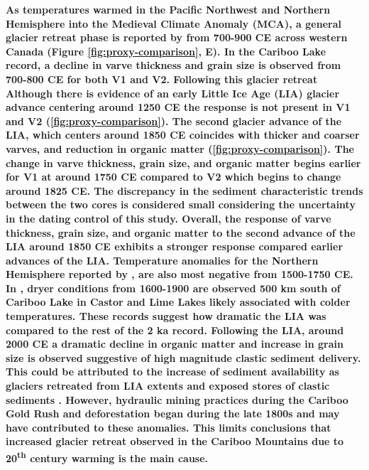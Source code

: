 \documentclass[Royal,times,doublespace,sageh]{sagej}
\begin{document}
\textbf{As temperatures warmed in the Pacific Northwest
\citep{Steinman2012} and Northern Hemisphere \citep{Moberg2005} into the
Medieval Climate Anomaly (MCA), a general glacier retreat phase is
reported by \citet{Solomina2016} from 700-900 CE across western Canada
(Figure \ref{fig:proxy-comparison}, E). In the Cariboo Lake record, a
decline in varve thickness and grain size is observed from 700-800 CE
for both V1 and V2. Following this glacier retreat Although there is
evidence of an early Little Ice Age (LIA) glacier advance centering
around 1250 CE \citep{Luckman1995, Osborn2001, Leonard1997} the response
is not present in V1 and V2 (\ref{fig:proxy-comparison}). The second
glacier advance of the LIA, which centers around 1850 CE
\citep{Luckman2000e, Leonard1997} coincides with thicker and coarser
varves, and reduction in organic matter (\ref{fig:proxy-comparison}).
The change in varve thickness, grain size, and organic matter begins
earlier for V1 at around 1750 CE compared to V2 which begins to change
around 1825 CE. The discrepancy in the sediment characteristic trends
between the two cores is considered small considering the uncertainty in
the dating control of this study. Overall, the response of varve
thickness, grain size, and organic matter to the second advance of the
LIA around 1850 CE exhibits a stronger response compared earlier
advances of the LIA. Temperature anomalies for the Northern Hemisphere
reported by \citet{Moberg2005}, are also most negative from 1500-1750
CE. In \citet{Steinman2012}, dryer conditions from 1600-1900 are
observed 500 km south of Cariboo Lake in Castor and Lime Lakes likely
associated with colder temperatures. These records suggest how dramatic
the LIA was compared to the rest of the 2 ka record. Following the LIA,
around 2000 CE a dramatic decline in organic matter and increase in
grain size is observed suggestive of high magnitude clastic sediment
delivery. This could be attributed to the increase of sediment
availability as glaciers retreated from LIA extents and exposed stores
of clastic sediments \citep{Beedle2015}. However, hydraulic mining
practices during the Cariboo Gold Rush and deforestation began during
the late 1800s and may have contributed to these anomalies. This limits
conclusions that increased glacier retreat observed in the Cariboo
Mountains due to 20\textsuperscript{th} century warming
\citep{Beedle2015} is the main cause.}
\end{document}
